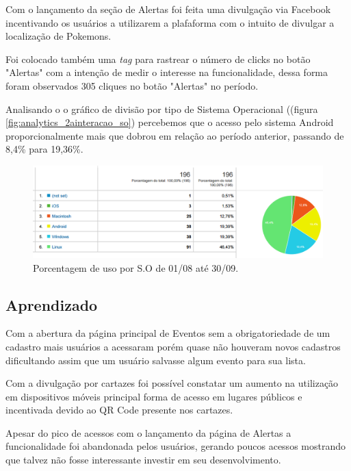 \par Com o lançamento da seção de Alertas foi feita uma divulgação via Facebook incentivando os usuários a utilizarem a plafaforma com o intuito de divulgar a localização de Pokemons.
\par Foi colocado também uma \emph{tag} para rastrear o número de clicks no botão "Alertas" com a intenção de medir o interesse na funcionalidade, dessa forma foram observados 305 cliques no botão "Alertas" no período.

\par Analisando o o gráfico de divisão por tipo de Sistema Operacional ((figura \ref{fig:analytics_2ainteracao_so}) percebemos que o acesso pelo sistema Android proporcionalmente mais que dobrou em relação ao período anterior, passando de 8,4\% para 19,36\%.

\begin{figure}[htb]
\includegraphics[width=15cm]{figuras/analytics_2ainteracao_so}
\caption{\label{fig:analytics_1interacao_so} Porcentagem de uso por S.O de 01/08 até 30/09.}
\end{figure}

\subsection{Aprendizado}

\par Com a abertura da página principal de Eventos sem a obrigatoriedade de um cadastro mais usuários a acessaram porém quase não houveram novos cadastros dificultando assim que um usuário salvasse algum evento para sua lista.

\par Com a divulgação por cartazes foi possível constatar um aumento na utilização em dispositivos móveis principal forma de acesso em lugares públicos e incentivada devido ao QR Code presente nos cartazes.

\par Apesar do pico de acessos com o lançamento da página de Alertas a funcionalidade foi abandonada pelos usuários, gerando poucos acessos mostrando que talvez não fosse interessante investir em seu desenvolvimento.

